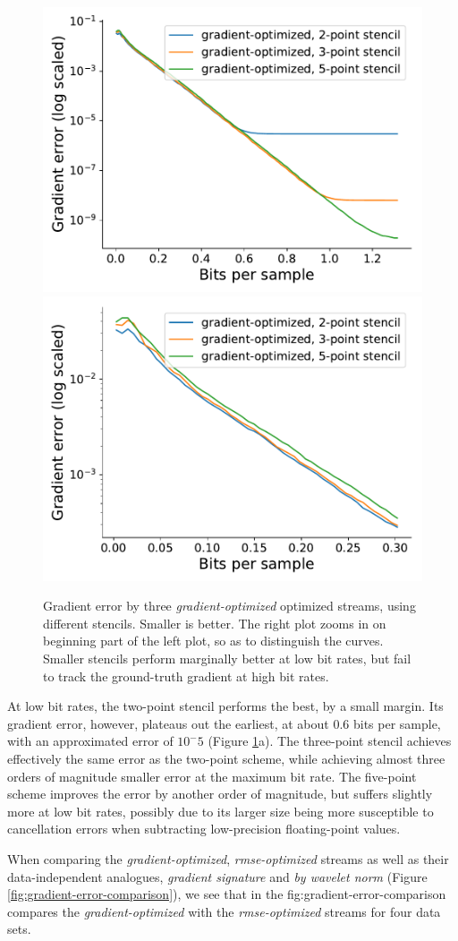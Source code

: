 \begin{figure}
	\centering
	{\includegraphics[width=0.48\linewidth]{img/gradient-laplacian/sine-gradient-stencils-full.pdf}}
	{\includegraphics[width=0.48\linewidth]{img/gradient-laplacian/sine-gradient-stencils-cutoff.pdf}}
	\caption{Gradient error by three \emph{gradient-optimized} optimized	streams, using different
	 stencils. Smaller is better. The right plot zooms in on beginning part of the left plot, so as to
	 distinguish the curves. Smaller stencils perform marginally better at low bit rates, but fail to
	 track the ground-truth gradient at high bit rates.}
  \label{fig:gradient-error-comparison-stencils}
\end{figure}

At low bit rates, the two-point stencil performs the best, by a small margin. Its gradient error,
however, plateaus out the earliest, at about $0.6$ bits per sample, with an approximated error of
$10^-5$ (Figure \ref{fig:gradient-error-comparison-stencils}a). The three-point stencil achieves
effectively the same error as the two-point scheme, while achieving almost three orders of magnitude
smaller error at the maximum bit rate. The five-point scheme improves the error by another order of
magnitude, but suffers slightly more at low bit rates, possibly due to its larger size being more
susceptible to cancellation errors when subtracting low-precision floating-point values.

When comparing the \emph{gradient-optimized}, \emph{rmse-optimized} streams as well as their
data-independent analogues, \emph{gradient signature} and \emph{by wavelet norm} (Figure
\ref{fig:gradient-error-comparison}), we see that in the {fig:gradient-error-comparison} compares the \emph{gradient-optimized} with the
\emph{rmse-optimized} streams for four data sets.

